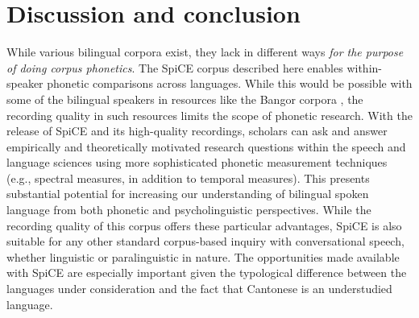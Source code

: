 \section{Discussion and conclusion}\label{ch2:subsec:discussion}

While various bilingual corpora exist, they lack in different ways \textit{for the purpose of doing corpus phonetics}. The SpiCE corpus described here enables within-speaker phonetic comparisons across languages. While this would be possible with some of the bilingual speakers in resources like the Bangor corpora \citep{deuchar_2014_corpora}, the recording quality in such resources limits the scope of phonetic research. With the release of SpiCE and its high-quality recordings, scholars can ask and answer empirically and theoretically motivated research questions within the speech and language sciences using more sophisticated phonetic measurement techniques (e.g., spectral measures, in addition to temporal measures). This presents substantial potential for increasing our understanding of bilingual spoken language from both phonetic and psycholinguistic perspectives. While the recording quality of this corpus offers these particular advantages, SpiCE is also suitable for any other standard corpus-based inquiry with conversational speech, whether linguistic or paralinguistic in nature. The opportunities made available with SpiCE are especially important given the typological difference between the languages under consideration and the fact that Cantonese is an understudied language. 

\endinput %

